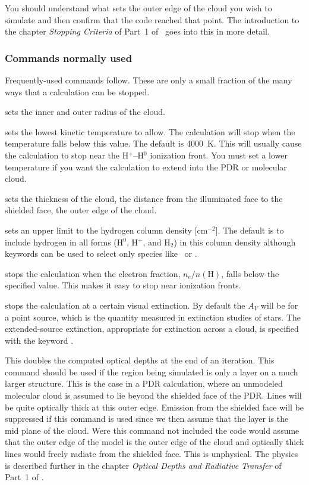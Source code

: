\documentclass[12pt,twoside]{article}
\begin{document}
You should understand what sets the outer edge of the cloud you wish
to simulate and then confirm that the code reached that point.  The
introduction to the chapter \emph{Stopping Criteria}
of Part~1 of \Hazy\ goes into
this in more detail.

\subsubsection{Commands normally used}

Frequently-used commands follow.
These are only a small fraction of the many ways that
a calculation can be stopped.

 sets the inner and outer radius of the cloud.

 sets the lowest
kinetic temperature to allow.  The
calculation will stop when the temperature falls below this value.  The
default is 4000~K.  This will usually cause the calculation to stop near
the H$^+$--H$^0$ ionization front.  You must
set a lower temperature if you want
the calculation to extend into the PDR or molecular cloud.

 sets the thickness
of the cloud, the distance from the
illuminated face to the shielded face, the outer edge of the cloud.

  sets an upper
limit to the hydrogen column density
[cm$^{-2}$].
The default is to include hydrogen in all forms (H$^0$,
H$^+$, and H$_2$) in this column density
although keywords can be used to select only species
like \hplus\ or \hO.

 stops the calculation
when the electron fraction, $n_e/n(\mathrm{H})$,
falls below the specified value.  This makes it easy to stop near ionization
fronts.

 stops the calculation at a
certain visual extinction.
By default the $A_V$ will be for a point source,
which is the quantity measured in extinction studies of stars.
The extended-source extinction, appropriate for extinction
across a cloud, is specified with the keyword .

\label{command:double}
This doubles the computed optical depths at the end of an
iteration.  This command should be used if the region being simulated is
only a layer on a much larger structure.  This is the case in a PDR
calculation, where an unmodeled molecular cloud is assumed to lie beyond
the shielded face of the PDR.  Lines will be quite optically thick at this
outer edge.  Emission from the shielded face will be suppressed if this
command is used since we then assume that the layer is the mid plane of
the cloud. Were this command not included the code would assume that the
outer edge of the model is the outer edge of the cloud and optically thick
lines would freely radiate from the shielded face.  This is unphysical.
The physics is described further in the chapter
\emph{Optical Depths and Radiative Transfer} of Part~1 of \Hazy.
\end{document}
